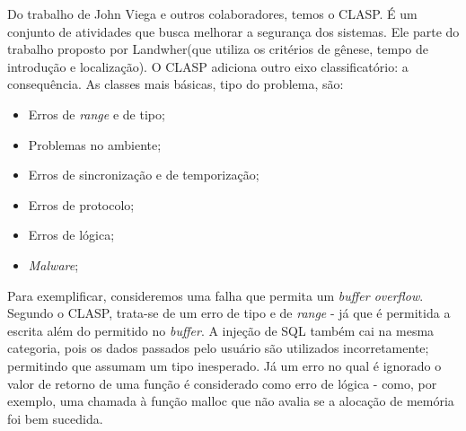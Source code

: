 			Do trabalho de John Viega e outros colaboradores, temos o CLASP. É um conjunto
			de atividades que busca melhorar a segurança dos sistemas. Ele parte do trabalho
			proposto por Landwher(que utiliza os critérios de gênese, tempo de introdução e localização).
			O CLASP adiciona outro eixo classificatório: a consequência.
			As classes mais básicas, tipo do problema, são:
			\begin{itemize}
				\item{Erros de \textsl{range} e de tipo;}
				\item{Problemas no ambiente;}
				\item{Erros de sincronização e de temporização;}
				\item{Erros de protocolo;}
				\item{Erros de lógica;}
				\item{\textsl{Malware};}
			\end{itemize}
			Para exemplificar, consideremos uma falha que permita um \textsl{buffer overflow}.
			Segundo o CLASP, trata-se de um erro de tipo e de \textsl{range} - já
			que é permitida a escrita além do permitido no \textsl{buffer}. A injeção de SQL
			também cai na mesma categoria, pois os dados passados pelo usuário são utilizados
			incorretamente; permitindo que assumam um tipo inesperado. Já um erro no qual é ignorado
			o valor de retorno de uma função é considerado como erro de lógica - como, por exemplo,
			uma chamada à função malloc que não avalia se a alocação de memória foi bem sucedida.


